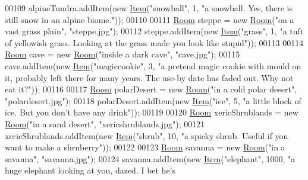 \begin{DoxyCode}
00109         alpineTundra.addItem(\textcolor{keyword}{new} \hyperlink{classpkg__world_1_1Item}{Item}(\textcolor{stringliteral}{"snowball"}, 1, \textcolor{stringliteral}{"a snowball. Yes, there is still snow in an alpine
       biome."}));
00110 
00111         \hyperlink{classpkg__world_1_1Room}{Room} steppe = \textcolor{keyword}{new} \hyperlink{classpkg__world_1_1Room}{Room}(\textcolor{stringliteral}{"on a vast grass plain"}, \textcolor{stringliteral}{"steppe.jpg"});
00112         steppe.addItem(\textcolor{keyword}{new} \hyperlink{classpkg__world_1_1Item}{Item}(\textcolor{stringliteral}{"grass"}, 1, \textcolor{stringliteral}{"a tuft of yellowish grass. Looking at the grass made you
       look like stupid"}));
00113 
00114         \hyperlink{classpkg__world_1_1Room}{Room} cave = \textcolor{keyword}{new} \hyperlink{classpkg__world_1_1Room}{Room}(\textcolor{stringliteral}{"inside a dark cave"}, \textcolor{stringliteral}{"cave.jpg"});
00115         cave.addItem(\textcolor{keyword}{new} \hyperlink{classpkg__world_1_1Item}{Item}(\textcolor{stringliteral}{"magiccookie"}, 3, \textcolor{stringliteral}{"a pretend magic cookie with mould on it, probably left
       there for many years. The use-by date has faded out. Why not eat it?"}));
00116 
00117         \hyperlink{classpkg__world_1_1Room}{Room} polarDesert = \textcolor{keyword}{new} \hyperlink{classpkg__world_1_1Room}{Room}(\textcolor{stringliteral}{"in a cold polar desert"}, \textcolor{stringliteral}{"polardesert.jpg"});
00118         polarDesert.addItem(\textcolor{keyword}{new} \hyperlink{classpkg__world_1_1Item}{Item}(\textcolor{stringliteral}{"ice"}, 5, \textcolor{stringliteral}{"a little block of ice. But you don't have any drink"}));
00119 
00120         \hyperlink{classpkg__world_1_1Room}{Room} xericShrublands = \textcolor{keyword}{new} \hyperlink{classpkg__world_1_1Room}{Room}(\textcolor{stringliteral}{"in a sand desert"}, \textcolor{stringliteral}{"xericshrublands.jpg"});
00121         xericShrublands.addItem(\textcolor{keyword}{new} \hyperlink{classpkg__world_1_1Item}{Item}(\textcolor{stringliteral}{"shrub"}, 10, \textcolor{stringliteral}{"a spicky shrub. Useful if you want to make a
       shruberry"}));
00122 
00123         \hyperlink{classpkg__world_1_1Room}{Room} savanna = \textcolor{keyword}{new} \hyperlink{classpkg__world_1_1Room}{Room}(\textcolor{stringliteral}{"in a savanna"}, \textcolor{stringliteral}{"savanna.jpg"});
00124         savanna.addItem(\textcolor{keyword}{new} \hyperlink{classpkg__world_1_1Item}{Item}(\textcolor{stringliteral}{"elephant"}, 1000, \textcolor{stringliteral}{"a huge elephant looking at you, dazed. I bet he's
}
\end{DoxyCode}
